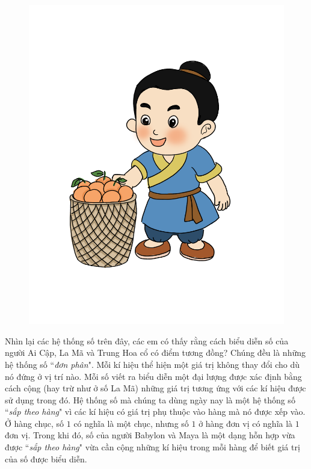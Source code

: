 	\vskip 0.1cm
		\begin{figure}
		\centering
		\vspace*{-35pt}
		\captionsetup{labelformat= empty, justification=centering}
		\includegraphics[width=1\linewidth]{20.12-pi.3}
		\vspace*{-50pt}
	\end{figure}
	Nhìn lại các hệ thống số trên đây, các em có thấy rằng cách biểu diễn số của người Ai Cập, La Mã và Trung Hoa cổ có điểm tương đồng? Chúng đều là những hệ thống số ``\textit{đơn phân}". Mỗi kí hiệu thể hiện một giá trị không thay đổi cho dù nó đứng ở vị trí nào. Mỗi số viết ra biểu diễn một đại lượng được xác định bằng cách  cộng (hay trừ như ở số La Mã) những giá trị tương ứng với các kí hiệu được sử dụng trong đó. Hệ thống số mà chúng ta dùng ngày nay là một hệ thống số ``\textit{sắp theo hàng}" vì các kí hiệu có giá trị phụ thuộc vào hàng mà nó được xếp vào. Ở hàng chục, số $1$ có nghĩa là một chục, nhưng số $1$ ở hàng đơn vị có nghĩa là $1$ đơn vị. Trong khi đó, số của người Babylon và Maya là một dạng hỗn hợp vừa được ``\textit{sắp theo hàng}" vừa cần cộng những kí hiệu trong mỗi hàng để biết giá trị của số được biểu diễn.
